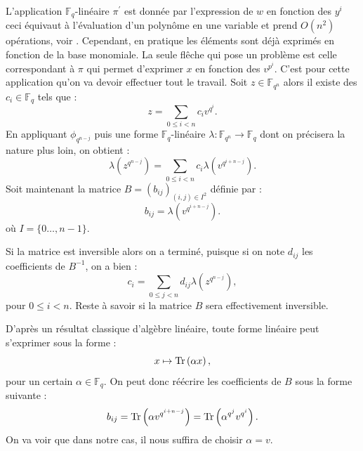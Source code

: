 \documentclass[a4paper]{article} %
\numberwithin{section}{part}
\numberwithin{equation}{section}
\newcommand\GF[1]{\mathbb{F}_{#1}}
\newcommand\Tr[1]{\textup{Tr}\left(#1\right)}
\begin{document}
L'application $\GF{q}$-linéaire $\pi^{\prime}$ est donnée par l'expression de 
$w$ en fonction des $y^i$ ceci équivaut à l'évaluation d'un polynôme en une
variable et prend $O(n^2)$ opérations, voir \cite[th. 5.1]{GaGe}. Cependant, en 
pratique les éléments sont déjà exprimés en fonction de la base monomiale. La 
seule flêche qui pose un problème est celle correspondant à $\pi$ qui permet 
d'exprimer $x$ en fonction des $v^{p^i}$. C'est pour cette application qu'on va 
devoir effectuer tout le travail. Soit $z\in\GF{q^n}$ alors il existe des 
$c_i\in\GF{q}$ tels que :
\begin{equation}
z = \sum_{0 \leq i < n}{c_iv^{q^i}}.
\end{equation}
En appliquant $\phi_{q^{n-j}}$ puis une forme $\GF{q}$-linéaire $\lambda
: \GF{q^n} \to \GF{q}$ dont on précisera la nature plus loin, on obtient :
\begin{equation}
\lambda\left(z^{q^{n-j}}\right) = \sum_{0\leq i < n}
{c_i\lambda\left(v^{q^{i+n-j}}\right)}.
\end{equation}
Soit maintenant la matrice $B = (b_{ij})_{(i,j)\in I^2}$ définie par :
\begin{equation}
b_{ij} = \lambda\left(v^{q^{i+n-j}}\right).
\end{equation}
où $I = \lbrace{0\dots,n-1}\rbrace$.\par
Si la matrice est inversible alors on a terminé, puisque si on note $d_{ij}$ les
coefficients de $B^{-1}$, on a bien :
\begin{equation}
c_i = \sum_{0\leq j < n}{d_{ij}\lambda\left(z^{q^{n-j}}\right)},
\end{equation}
pour $0\leq i < n$. Reste à savoir si la matrice $B$ sera effectivement 
inversible.\par
D'après un résultat classique d'algèbre linéaire, toute forme linéaire peut
s'exprimer sous la forme :
\begin{equation}
x \mapsto \Tr{\alpha x},
\end{equation}
pour un certain $\alpha\in\GF{q}$. On peut donc réécrire les coefficients de $B$
sous la forme suivante :
\begin{equation}
b_{ij} = \Tr{\alpha v^{q^{i+n-j}}} = \Tr{\alpha^{q^j}v^{q^i}}.
\end{equation}
On va voir que dans notre cas, il nous suffira de choisir $\alpha = v$.
\end{document}
